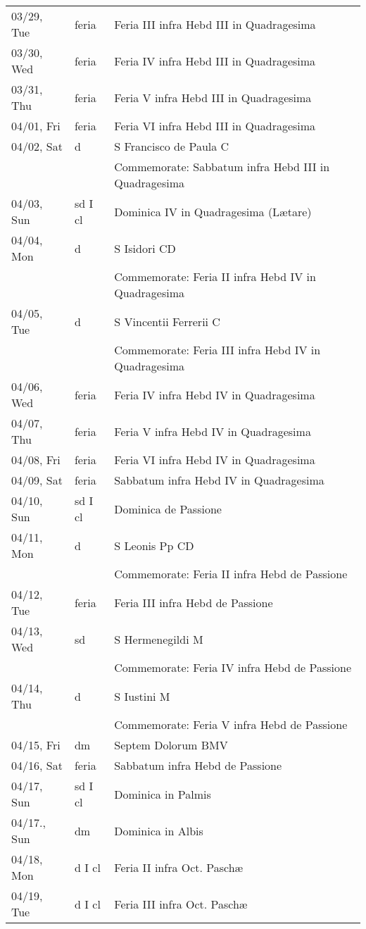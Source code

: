 \documentclass{article}
\begin{document}
\begin{longtable}{ l l l }
03/29, Tue & feria & Feria III infra Hebd III in Quadragesima\\
03/30, Wed & feria & Feria IV infra Hebd III in Quadragesima\\
03/31, Thu & feria & Feria V infra Hebd III in Quadragesima\\
04/01, Fri & feria & Feria VI infra Hebd III in Quadragesima\\
04/02, Sat & d & S Francisco de Paula C\\
 & & Commemorate: Sabbatum infra Hebd III in Quadragesima\\
04/03, Sun & sd I cl & Dominica IV in Quadragesima (Lætare)\\
04/04, Mon & d & S Isidori CD\\
 & & Commemorate: Feria II infra Hebd IV in Quadragesima \\
04/05, Tue & d & S Vincentii Ferrerii C\\
 & & Commemorate: Feria III infra Hebd IV in Quadragesima \\
04/06, Wed & feria & Feria IV infra Hebd IV in Quadragesima \\
04/07, Thu & feria & Feria V infra Hebd IV in Quadragesima \\
04/08, Fri & feria & Feria VI infra Hebd IV in Quadragesima \\
04/09, Sat & feria & Sabbatum infra Hebd IV in Quadragesima \\
04/10, Sun & sd I cl & Dominica de Passione\\
04/11, Mon & d & S Leonis Pp CD\\
 & & Commemorate: Feria II infra Hebd de Passione\\
04/12, Tue & feria & Feria III infra Hebd de Passione\\
04/13, Wed & sd & S Hermenegildi M\\
 & & Commemorate: Feria IV infra Hebd de Passione\\
04/14, Thu & d & S Iustini M\\
 & & Commemorate: Feria V infra Hebd de Passione\\
04/15, Fri & dm & Septem Dolorum BMV\\
04/16, Sat & feria & Sabbatum infra Hebd de Passione\\
04/17, Sun & sd I cl & Dominica in Palmis\\
04/17., Sun & dm & Dominica in Albis\\
04/18, Mon & d I cl & Feria II infra Oct. Paschæ\\
04/19, Tue & d I cl & Feria III infra Oct. Paschæ\\

\end{longtable}
\end{document}
